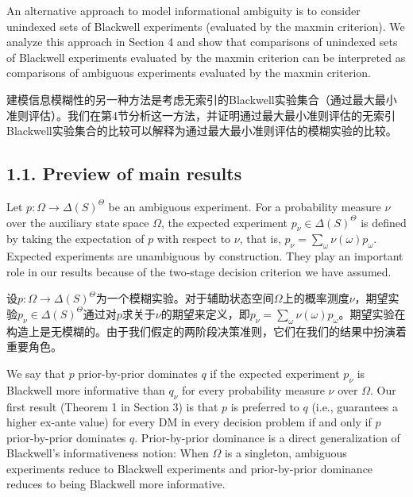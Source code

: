 \documentclass[12pt,a4paper]{article}
\newenvironment{original}
  {\par\vspace{4pt}\noindent\color{black}\ignorespaces}
  {\par\vspace{2pt}}
\newenvironment{translation}
  {\par\vspace{2pt}\noindent\color{myblue}\ignorespaces}
  {\par\vspace{6pt}}
\newcommand{\bisubsection}[2]{%
  \subsection{#1}%
  \vspace{-2pt}%
  \noindent{\color{myblue}\bfseries #2}%
  \vspace{4pt}%
}
\newcommand{\Delt}{\Delta}
\begin{document}
\begin{original}
An alternative approach to model informational ambiguity is to consider unindexed sets of Blackwell experiments (evaluated by the maxmin criterion). We analyze this approach in Section 4 and show that comparisons of unindexed sets of Blackwell experiments evaluated by the maxmin criterion can be interpreted as comparisons of ambiguous experiments evaluated by the maxmin criterion.
\end{original}

\begin{translation}
建模信息模糊性的另一种方法是考虑无索引的Blackwell实验集合（通过最大最小准则评估）。我们在第4节分析这一方法，并证明通过最大最小准则评估的无索引Blackwell实验集合的比较可以解释为通过最大最小准则评估的模糊实验的比较。
\end{translation}


\bisubsection{1.1. Preview of main results}{1.1. 主要结果预览}

\begin{original}
Let $p:\Omega\to\Delt(S)^{\Theta}$ be an ambiguous experiment. For a probability measure $\nu$ over the auxiliary state space $\Omega$, the expected experiment $p_{\nu}\in\Delt(S)^{\Theta}$ is defined by taking the expectation of $p$ with respect to $\nu$, that is, $p_{\nu}=\sum_{\omega}\nu(\omega)p_{\omega}$. Expected experiments are unambiguous by construction. They play an important role in our results because of the two-stage decision criterion we have assumed.
\end{original}

\begin{translation}
设$p:\Omega\to\Delt(S)^{\Theta}$为一个模糊实验。对于辅助状态空间$\Omega$上的概率测度$\nu$，期望实验$p_{\nu}\in\Delt(S)^{\Theta}$通过对$p$求关于$\nu$的期望来定义，即$p_{\nu}=\sum_{\omega}\nu(\omega)p_{\omega}$。期望实验在构造上是无模糊的。由于我们假定的两阶段决策准则，它们在我们的结果中扮演着重要角色。
\end{translation}

\begin{original}
We say that $p$ prior-by-prior dominates $q$ if the expected experiment $p_{\nu}$ is Blackwell more informative than $q_{\nu}$ for every probability measure $\nu$ over $\Omega$. Our first result (Theorem 1 in Section 3) is that $p$ is preferred to $q$ (i.e., guarantees a higher ex-ante value) for every DM in every decision problem if and only if $p$ prior-by-prior dominates $q$. Prior-by-prior dominance is a direct generalization of Blackwell's informativeness notion: When $\Omega$ is a singleton, ambiguous experiments reduce to Blackwell experiments and prior-by-prior dominance reduces to being Blackwell more informative.
\end{original}
\end{document}
